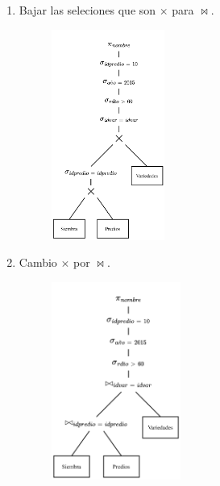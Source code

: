 \documentclass{templateNote}
\begin{document}
\begin{enumerate}
\begin{itemize}
\begin{enumerate}
            \item Bajar las seleciones que son $\times$ para $\Join$.
            \begin{figure}[H]
                \centering
                \includegraphics[width=0.35\textwidth]{img/E1-Paso-3.png}
            \end{figure}

            \item Cambio $\times$ por $\Join$.
            \begin{figure}[H]
                \centering
                \includegraphics[width=0.4\textwidth]{img/E1-Paso-4.png}
            \end{figure}


\end{enumerate}
\end{itemize}
\end{enumerate}
\end{document}
